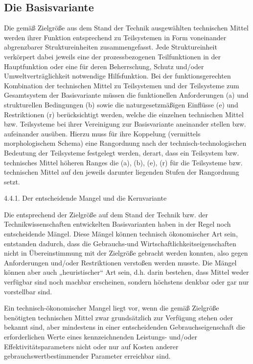 \documentclass[12pt,a4paper]{article}
\begin{document}
\subsection{Die Basisvariante}

Die gemäß Zielgröße aus dem Stand der Technik ausgewählten technischen Mittel
werden ihrer Funktion entsprechend zu Teilsystemen in Form voneinander
abgrenzbarer Struktureinheiten zusammengefasst. Jede Struktureinheit
verkörpert dabei jeweils eine der prozessbezogenen Teilfunktionen in der
Hauptfunktion oder eine für deren Beherrschung, Schutz und/oder
Umweltverträglichkeit notwendige Hilfsfunktion. Bei der funktionsgerechten
Kombination der technischen Mittel zu Teilsystemen und der Teilsysteme zum
Gesamtsystem der Basisvariante müssen die funktionellen Anforderungen (a) und
strukturellen Bedingungen (b) sowie die naturgesetzmäßigen Einflüsse (e) und
Restriktionen (r) berücksichtigt werden, welche die einzelnen technischen
Mittel bzw. Teilsysteme bei ihrer Vereinigung zur Basisvariante aneinander
stellen bzw. aufeinander ausüben. Hierzu muss für ihre Koppelung (vermittels
morphologischem Schema) eine Rangordnung nach der technisch-technologischen
Bedeutung der Teilsysteme festgelegt werden, derart, dass ein Teilsystem
bzw. technisches Mittel höheren Ranges die (a), (b), (e), (r) für die
Teilsysteme bzw. technischen Mittel auf den jeweils darunter liegenden Stufen
der Rangordnung setzt.

4.4.1. Der entscheidende Mangel und die Kernvariante

Die entsprechend der Zielgröße auf dem Stand der Technik bzw. der
Technikwissenschaften entwickelten Basisvarianten haben in der Regel noch
entscheidende Mängel. Diese Mängel können technisch ökonomischer Art sein,
entstanden dadurch, dass die Gebrauchs-und Wirtschaftlichkeitseigenschaften
nicht in Übereinstimmung mit der Zielgröße gebracht werden konnten, also gegen
Anforderungen und/oder Restriktionen verstoßen werden musste. Die Mängel
können aber auch „heuristischer“ Art sein, d.h. darin bestehen, dass Mittel
weder verfügbar sind noch machbar erscheinen, sondern höchstens denkbar oder
gar nur vorstellbar sind.

Ein technisch-ökonomischer Mangel liegt vor, wenn die gemäß Zielgröße
benötigten technischen Mittel zwar grundsätzlich zur Verfügung stehen oder
bekannt sind, aber mindestens in einer entscheidenden Gebrauchseigenschaft die
erforderlichen Werte eines kennzeichnenden Leistungs- und/oder
Effektivitätsparameters nicht oder nur auf Kosten anderer
gebrauchswertbestimmender Parameter erreichbar sind.
\end{document}
